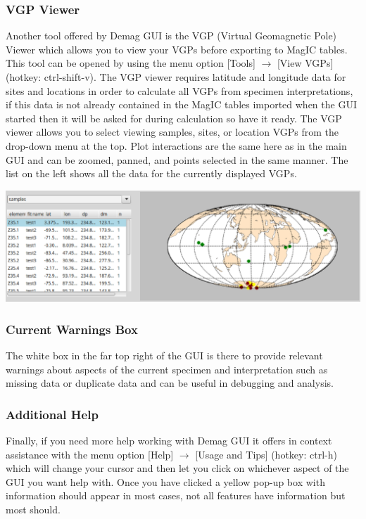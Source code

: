 \documentclass[11pt]{book}
\begin{document}
{{\subsubsection{VGP Viewer}\label{vgp-view}

Another tool offered by Demag GUI is the VGP (Virtual Geomagnetic Pole) Viewer which allows you to view your VGPs before exporting to MagIC tables. This tool can be opened by using the menu option [Tools] $\rightarrow$ [View VGPs] (hotkey: ctrl-shift-v). The VGP viewer requires latitude and longitude data for sites and locations in order to calculate all VGPs from specimen interpretations, if this data is not already contained in the MagIC tables imported when the GUI started then it will be asked for during calculation so have it ready. The VGP viewer allows you to select viewing samples, sites, or location VGPs from the drop-down menu at the top. Plot interactions are the same here as in the main GUI and can be zoomed, panned, and points selected in the same manner. The list on the left shows all the data for the currently displayed VGPs.

\includegraphics[width=15 cm]{EPSFiles/demag_gui_VGPViewer.eps}

\subsubsection{Current Warnings Box}\label{warn-box}

The white box in the far top right of the GUI is there to provide relevant warnings about aspects of the current specimen and interpretation such as missing data or duplicate data and can be useful in debugging and analysis.

\subsubsection{Additional Help}\label{add-help}

Finally, if you need more help working with Demag GUI it offers in context assistance with the menu option [Help] $\rightarrow$ [Usage and Tips] (hotkey: ctrl-h) which will change your cursor and then let you click on whichever aspect of the GUI you want help with. Once you have clicked a yellow pop-up box with information should appear in most cases, not all features have information but most should.

}}
\end{document}
